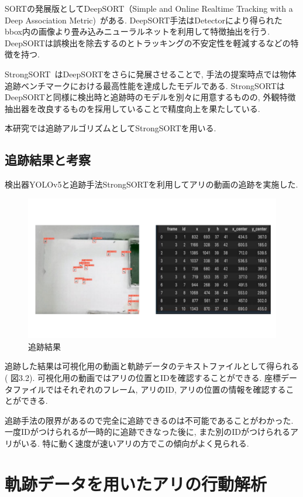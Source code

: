 ﻿\documentclass[a4paper, 12pt]{jsreport}
\begin{document}
SORTの発展版としてDeepSORT（Simple and Online Realtime Tracking with a Deep Association Metric)~\cite{8}がある. DeepSORT手法はDetectorにより得られたbbox内の画像より畳み込みニューラルネットを利用して特徴抽出を行う. DeepSORTは誤検出を除去するのとトラッキングの不安定性を軽減するなどの特徴を持つ. 

StrongSORT~\cite{9}はDeepSORTをさらに発展させることで, 手法の提案時点では物体追跡ベンチマークにおける最高性能を達成したモデルである. StrongSORTはDeepSORTと同様に検出時と追跡時のモデルを別々に用意するものの, 外観特徴抽出器を改良するものを採用していることで精度向上を果たしている. 

本研究では追跡アルゴリズムとしてStrongSORTを用いる. 


\section{追跡結果と考察}
\label{sec:result}
検出器YOLOv5と追跡手法StrongSORTを利用してアリの動画の追跡を実施した. 
\begin{figure}[tbp]
\centering
\includegraphics[width=13cm,  keepaspectratio]{tracking_data.pdf}
\caption[Short figure caption for List of Figures]{追跡結果}
\label{fig:paper1_fig7}
\end{figure}

追跡した結果は可視化用の動画と軌跡データのテキストファイルとして得られる( 図3.2). 可視化用の動画ではアリの位置とIDを確認することができる. 座標データファイルではそれぞれのフレーム, アリのID, アリの位置の情報を確認することができる. 

追跡手法の限界があるので完全に追跡できるのは不可能であることがわかった. 一度IDがつけられるが一時的に追跡できなった後に, また別のIDがつけられるアリがいる. 特に動く速度が速いアリの方でこの傾向がよく見られる. 
\chapter{軌跡データを用いたアリの行動解析}
\label{chap:analys}
\end{document}
